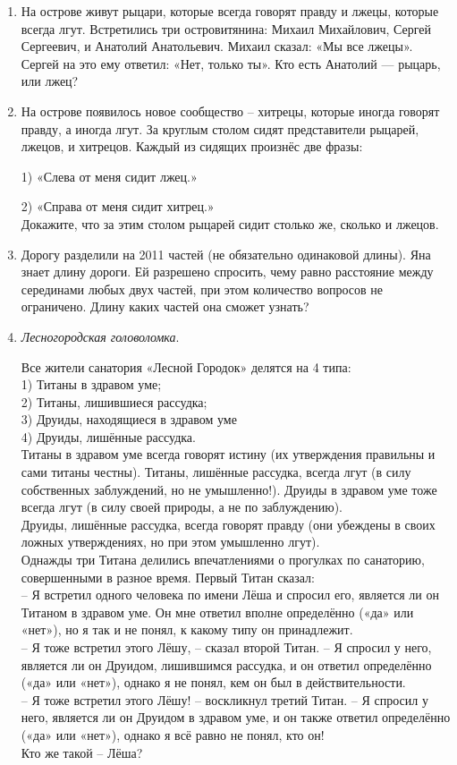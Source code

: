 \begin{enumerate}
    \item 
    На острове живут рыцари, которые всегда говорят правду и лжецы, которые всегда лгут. Встретились три островитянина: Михаил Михайлович, Сергей Сергеевич, и Анатолий Анатольевич. Михаил сказал: «Мы все лжецы». Сергей на это ему ответил: «Нет, только ты». Кто есть Анатолий  — рыцарь, или лжец?

    \item 
    На острове появилось новое сообщество -- хитрецы, которые иногда говорят правду, а иногда лгут. За круглым столом сидят представители рыцарей, лжецов, и хитрецов. Каждый из сидящих произнёс две фразы:
    \par 1) «Слева от меня сидит лжец.» 
    \par 2) «Справа от меня сидит хитрец.»
    \\ Докажите, что за этим столом рыцарей сидит столько же, сколько и лжецов.
    
    \item 
    Дорогу разделили на 2011 частей (не обязательно одинаковой длины). Яна знает длину дороги. Ей разрешено спросить, чему равно расстояние между серединами любых двух частей, при этом количество вопросов не ограничено. Длину каких частей она сможет узнать?

    \item 
    \textit{Лесногородская головоломка}. 
    \par Все жители санатория «Лесной Городок» делятся на 4 типа:
    \\ 1) Титаны в здравом уме; 
    \\ 2) Титаны, лишившиеся рассудка;
    \\ 3) Друиды, находящиеся в здравом уме
    \\ 4) Друиды, лишённые рассудка. 
    \\ Титаны в здравом уме всегда говорят истину (их утверждения правильны и сами титаны честны). Титаны, лишённые рассудка, всегда лгут (в силу собственных заблуждений, но не умышленно!). Друиды в здравом уме тоже всегда лгут (в силу своей природы, а не по заблуждению). 
    \\ Друиды, лишённые рассудка, всегда говорят правду (они убеждены в своих ложных утверждениях, но при этом умышленно лгут).
    \\ Однажды три Титана делились впечатлениями о прогулках по санаторию, совершенными в разное время. Первый Титан сказал:
    \\ -- Я встретил одного человека по имени Лёша и спросил его, является ли он Титаном в здравом уме. Он мне ответил вполне определённо («да» или «нет»), но я так и не понял, к какому типу он принадлежит.
    \\ -- Я тоже встретил этого Лёшу, -- сказал второй Титан. -- Я спросил у него, является ли он Друидом, лишившимся рассудка, и он ответил определённо («да» или «нет»), однако я не понял, кем он был в действительности.
    \\ -- Я тоже встретил этого Лёшу! -- воскликнул третий Титан. -- Я спросил у него, является ли он Друидом в здравом уме, и он также ответил определённо («да» или «нет»), однако я всё равно не понял, кто он!
    \\ Кто же такой -- Лёша?
\end{enumerate}